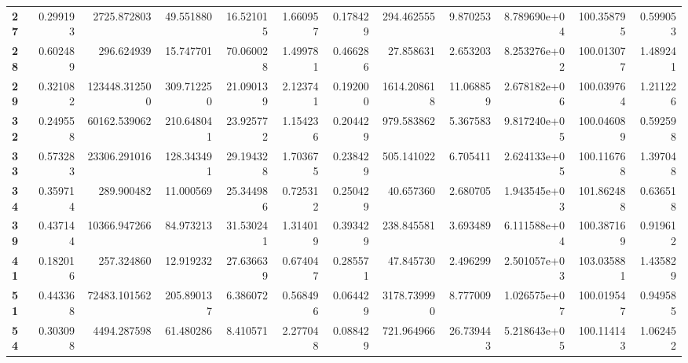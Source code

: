 \begin{table}[h]
\begin{tabular}{lrrrrrrrrrrr}
\textbf{27} &  0.299193 &    2725.872803 &       49.551880 &                  16.521015 &  1.660957 &  0.178429 &   294.462555 &   9.870253 &  8.789690e+04 &  100.358795 &     0.599053 \\
\textbf{28} &  0.602489 &     296.624939 &       15.747701 &                  70.060028 &  1.499781 &  0.466286 &    27.858631 &   2.653203 &  8.253276e+02 &  100.013077 &     1.489241 \\
\textbf{29} &  0.321082 &  123448.312500 &      309.712250 &                  21.090139 &  2.123741 &  0.192000 &  1614.208618 &  11.068859 &  2.678182e+06 &  100.039764 &     1.211226 \\
\textbf{32} &  0.249558 &   60162.539062 &      210.648041 &                  23.925772 &  1.154236 &  0.204429 &   979.583862 &   5.367583 &  9.817240e+05 &  100.046089 &     0.592598 \\
\textbf{33} &  0.573283 &   23306.291016 &      128.343491 &                  29.194328 &  1.703675 &  0.238429 &   505.141022 &   6.705411 &  2.624133e+05 &  100.116768 &     1.397048 \\
\textbf{34} &  0.359714 &     289.900482 &       11.000569 &                  25.344986 &  0.725312 &  0.250429 &    40.657360 &   2.680705 &  1.943545e+03 &  101.862488 &     0.636518 \\
\textbf{39} &  0.437144 &   10366.947266 &       84.973213 &                  31.530241 &  1.314019 &  0.393429 &   238.845581 &   3.693489 &  6.111588e+04 &  100.387169 &     0.919612 \\
\textbf{41} &  0.182016 &     257.324860 &       12.919232 &                  27.636639 &  0.674047 &  0.285571 &    47.845730 &   2.496299 &  2.501057e+03 &  103.035881 &     1.435829 \\
\textbf{51} &  0.443368 &   72483.101562 &      205.890137 &                   6.386072 &  0.568496 &  0.064429 &  3178.739990 &   8.777009 &  1.026575e+07 &  100.019547 &     0.949585 \\
\textbf{54} &  0.303098 &    4494.287598 &       61.480286 &                   8.410571 &  2.277048 &  0.088429 &   721.964966 &  26.739443 &  5.218643e+05 &  100.114143 &     1.062452 \\
\bottomrule
\end{tabular}
\end{table}
